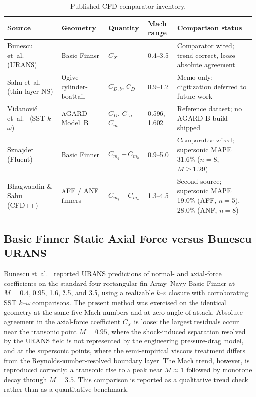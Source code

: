 \begin{table}[htbp]
  \centering
  \caption{Published-CFD comparator inventory.}
  \label{tab:cfd_inventory}
  \begin{tabularx}{\textwidth}{@{}l l l l X@{}}
    \toprule
    Source & Geometry & Quantity & Mach range & Comparison status \\
    \midrule
    Bunescu et~al.~\cite{bunescu2025} (URANS)
      & Basic Finner
      & $C_X$
      & 0.4--3.5
      & Comparator wired; trend correct, loose absolute agreement \\
    Sahu et~al.~\cite{sahu1983} (thin-layer NS)
      & Ogive-cylinder-boattail
      & $C_{D,b}$, $C_{D}$
      & 0.9--1.2
      & Memo only; digitization deferred to future work \\
    Vidanovi\'c et~al.~\cite{vidanovic2014} (SST $k$--$\omega$)
      & AGARD Model~B
      & $C_D$, $C_L$, $C_m$
      & 0.596, 1.602
      & Reference dataset; no AGARD-B build shipped \\
    Sznajder~\cite{sznajder2025} (Fluent)
      & Basic Finner
      & $C_{m_q}+C_{m_{\dot\alpha}}$
      & 0.9--5.0
      & Comparator wired; supersonic MAPE 31.6\% ($n=8$, $M\ge1.29$) \\
    Bhagwandin \& Sahu~\cite{bhagwandin2013} (CFD++)
      & AFF / ANF finners
      & $C_{m_q}+C_{m_{\dot\alpha}}$
      & 1.3--4.5
      & Second source; supersonic MAPE 19.0\% (AFF, $n=5$), 28.0\% (ANF, $n=8$) \\
    \bottomrule
  \end{tabularx}
\end{table}

\subsection{Basic Finner Static Axial Force versus Bunescu URANS}

Bunescu et~al.~\cite{bunescu2025} reported URANS predictions of normal- and
axial-force coefficients on the standard four-rectangular-fin Army--Navy Basic
Finner at $M = 0.4$, 0.95, 1.6, 2.5, and 3.5, using a realizable $k$--$\varepsilon$
closure with corroborating SST $k$--$\omega$ comparisons. The present method was
exercised on the identical geometry at the same five Mach numbers and at zero angle
of attack. Absolute agreement in the axial-force coefficient $C_X$ is loose: the
largest residuals occur near the transonic point $M = 0.95$, where the
shock-induced separation resolved by the URANS field is not represented by the
engineering pressure-drag model, and at the supersonic points, where the
semi-empirical viscous treatment differs from the Reynolds-number-resolved
boundary layer. The Mach trend, however, is reproduced correctly: a transonic rise
to a peak near $M \approx 1$ followed by monotone decay through $M = 3.5$. This
comparison is reported as a qualitative trend check rather than as a quantitative
benchmark.

